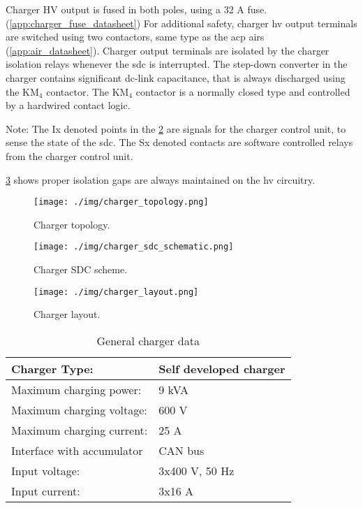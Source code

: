 Charger HV output is fused in both poles, using a 32 A fuse. (\ref{app:charger_fuse_datasheet}) For additional safety, charger \gls{hv} output terminals are switched using two contactors, same type as the \gls{acp} \glspl{air} (\ref{app:air_datasheet}). Charger output terminals are isolated by the charger isolation relays whenever the \gls{sdc} is interrupted. The step-down converter in the charger contains significant dc-link capacitance, that is always discharged using the KM$_4$ contactor. The KM$_4$ contactor is a normally closed type and controlled by a hardwired contact logic.

Note: The Ix denoted points in the \ref{fig:charger_sdc_scheme} are signals for the charger control unit, to sense the state of the \gls{sdc}. The Sx denoted contacts are software controlled relays from the charger control unit.

\ref{fig:charger_layout} shows proper isolation gaps are always maintained on the \gls{hv} circuitry.


\begin{figure}[H]
	\centering
	\texttt{[image: ./img/charger\_topology.png]}
	\caption{Charger topology.}
	\label{fig:charger_topology}
\end{figure}

\begin{figure}[H]
	\centering
	\texttt{[image: ./img/charger\_sdc\_schematic.png]}
	\caption{Charger SDC scheme.}
	\label{fig:charger_sdc_scheme}
\end{figure}

\begin{figure}[H]
	\centering
	\texttt{[image: ./img/charger\_layout.png]}
	\caption{Charger layout.}
	\label{fig:charger_layout}
\end{figure}

\begin{table}[H]
	\centering
	\caption{General charger data}
	\begin{tabu}{|X|X|}
		\hline
		Charger Type: & Self developed charger \\
		\hline
		Maximum charging power: & 9 kVA  \\
		\hline
		Maximum charging voltage: & 600 V \\
		\hline
		Maximum charging current: & 25 A \\
		\hline
		Interface with accumulator & CAN bus \\
		\hline
		Input voltage: & 3x400 V, 50 Hz \\
		\hline
		Input current: & 3x16 A \\
		\hline
	\end{tabu}%
	\label{tab:acc-charger}%
\end{table}%

